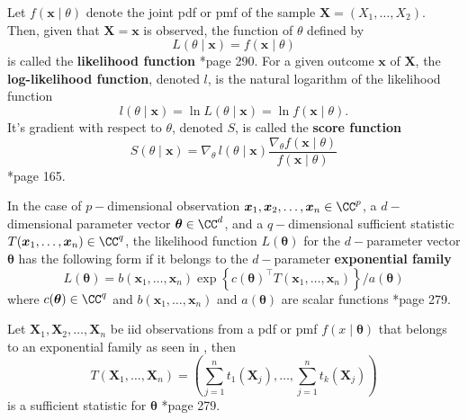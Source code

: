 \begin{defe} \label{defe: likelihood_function}
    Let $f(\bm{x} \mid \theta)$ denote the joint pdf or pmf of the sample $\bm{X} = (X_1 , \ldots , X_2)$. Then, given that $\bm{X} = \bm{x}$ is observed, the function of $\theta$ defined by
    \begin{equation*}
        L(\theta \mid \bm{x}) = f(\bm{x} \mid \theta)
    \end{equation*}
    is called the {\bf likelihood function} \cite{CasellaGeorge2001SI}*{page 290}. For a given outcome $\bm{x}$ of $\bm{X}$, the {\bf log-likelihood function}, denoted $l$, is the natural logarithm of the likelihood function
    \begin{equation*}
        l(\theta \mid \bm{x}) = \ln L(\theta \mid \bm{x}) = \ln f(\bm{x} \mid \theta).
    \end{equation*}
    It's gradient with respect to $\theta$, denoted $S$, is called the {\bf score function}
    \begin{equation*}
        S (\theta \mid \bm{x}) = \nabla_{\theta} \, l (\theta \mid \bm{x}) \frac{\nabla_{\theta} f(\bm{x} \mid \theta)}{f(\bm{x} \mid \theta)}
    \end{equation*}
    \cite{KroeseDirkP2013SMaC}*{page 165}.
\end{defe}

\begin{defe} \label{defe: exp_fam}
    In the case of $p-$dimensional observation $\bm{x}_1 , \bm{x}_2 , \ldots , \bm{x}_n \in \CC^{p}$, a $d-$dimensional parameter vector $\bm{\theta} \in \CC^{d}$, and a $q-$dimensional sufficient statistic $T(\bm{x}_1 , \ldots , \bm{x}_n) \in \CC^{q}$, the likelihood function $L (\bm{\theta})$ for the $d-$parameter vector $\bm{\theta}$ has the following form if it belongs to the $d-$parameter {\bf exponential family}
    \begin{equation*}
        L (\bm{\theta}) = b(\bm{x}_1 , \ldots , \bm{x}_n) \exp \left\{ c(\bm{\theta})^{\intercal} T(\bm{x}_1 , \ldots , \bm{x}_n) \right\} / a(\bm{\theta})
    \end{equation*}
    where $c(\bm{\theta}) \in \CC^{q}$ and $b(\bm{x}_1 , \ldots , \bm{x}_n)$ and $a(\bm{\theta})$ are scalar functions \cite{CasellaGeorge2001SI}*{page 279}.
\end{defe}

\begin{thm} \label{thm: exp_fam_ss}
    Let $\bm{X}_1 , \bm{X}_2 , \ldots , \bm{X}_n$ be iid observations from a pdf or pmf $f(x \mid \bm{\theta})$ that belongs to an exponential family as seen in , then
    \begin{equation*}
        T(\bm{X}_1 , \ldots , \bm{X}_n) = \left( \sum_{j=1}^{n} t_1 (\bm{X}_j) , \ldots , \sum_{j=1}^{n} t_k (\bm{X}_j) \right)
    \end{equation*}
    is a sufficient statistic for $\bm{\theta}$ \cite{CasellaGeorge2001SI}*{page 279}.
\end{thm}

